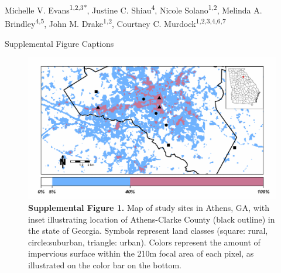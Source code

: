 \documentclass[12pt]{article}
\begin{document}
{\Large
\textbf{}}

\bigskip

Michelle V. Evans\textsuperscript{1,2,3*},
Justine C. Shiau\textsuperscript{4},
Nicole Solano\textsuperscript{1,2},
Melinda A. Brindley\textsuperscript{4,5},
John M. Drake\textsuperscript{1,2},
Courtney C. Murdock\textsuperscript{1,2,3,4,6,7}
\smallskip

{\Large{Supplemental Figure Captions}}

\begin{figure}
\centering
\includegraphics[width=6in]{SuppFig1.pdf}
\caption{\textbf{Supplemental Figure 1.} Map of study sites in Athens, GA, with inset illustrating location of Athens-Clarke County (black outline) in the state of Georgia. Symbols represent land classes (square: rural, circle:suburban, triangle: urban). Colors represent the amount of impervious surface within the 210m focal area of each pixel, as illustrated on the color bar on the bottom.}
\end{figure}
\end{document}
